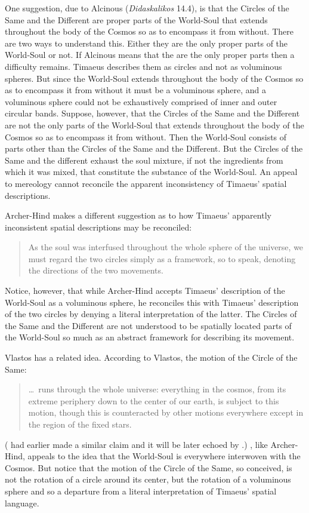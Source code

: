 One suggestion, due to Alcinous (\emph{Didaskalikos} 14.4), is that the Circles of the Same and the Different are proper parts of the World-Soul that extends throughout the body of the Cosmos so as to encompass it from without. There are two ways to understand this. Either they are the only proper parts of the World-Soul or not. If Alcinous means that the are the only proper parts then a difficulty remains. Timaeus describes them as circles and not as voluminous spheres. But since the World-Soul extends throughout the body of the Cosmos so as to encompass it from without it must be a voluminous sphere, and a voluminous sphere could not be exhaustively comprised of inner and outer circular bands. Suppose, however, that the Circles of the Same and the Different are not the only parts of the World-Soul that extends throughout the body of the Cosmos so as to encompass it from without. Then the World-Soul consists of parts other than the Circles of the Same and the Different. But the Circles of the Same and the different exhaust the soul mixture, if not the ingredients from which it was mixed, that constitute the substance of the World-Soul. An appeal to mereology cannot reconcile the apparent inconsistency of Timaeus' spatial descriptions.

Archer-Hind makes a different suggestion as to how Timaeus' apparently inconsistent spatial descriptions may be reconciled:
\begin{quote}
	As the soul was interfused throughout the whole sphere of the universe, we must regard the two circles simply as a framework, so to speak, denoting the directions of the two movements. \citep[112 n2]{Archer-Hind:1888qd}
\end{quote}
Notice, however, that while Archer-Hind accepts Timaeus' description of the World-Soul as a voluminous sphere, he reconciles this with Timaeus' description of the two circles by denying a literal interpretation of the latter. The Circles of the Same and the Different are not understood to be spatially located parts of the World-Soul so much as an abstract framework for describing its movement. 

Vlastos has a related idea. According to Vlastos, the motion of the Circle of the Same:
\begin{quote}
	\ldots\ runs through the whole universe: everything in the cosmos, from its extreme periphery down to the center of our earth, is subject to this motion, though this is counteracted by other motions everywhere except in the region of the fixed stars. \citep[32]{Vlastos:1975aa}
\end{quote}
(\citealt[76]{Cornford:1935fk} had earlier made a similar claim and it will be later echoed by \citealt[21--22 n26]{Zeyl:2000cs}.) \citet[32 n14]{Vlastos:1975aa}, like Archer-Hind, appeals to the idea that the World-Soul is everywhere interwoven with the Cosmos. But notice that the motion of the Circle of the Same, so conceived, is not the rotation of a circle around its center, but the rotation of a voluminous sphere and so a departure from a literal interpretation of Timaeus' spatial language. 

